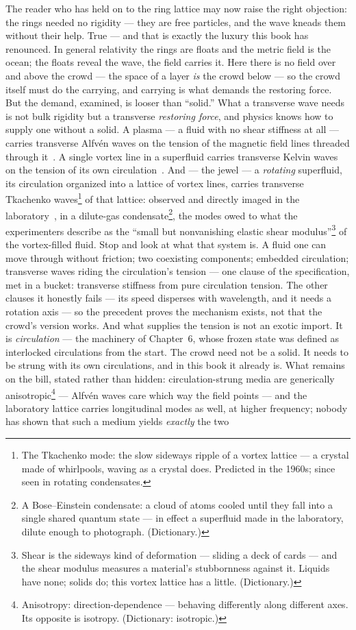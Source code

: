\documentclass[fontsize=11pt,paper=a4,pagesize=auto,parskip=half-]{scrbook}
\newcommand{\Ixtmp}{}
\DeclareRobustCommand{\Ix}[1]{%
  #1%
  \begingroup
    \lowercase{\gdef\Ixtmp{#1}}%
    \expandafter\index\expandafter{\Ixtmp}%
  \endgroup}
\begin{document}
The reader who has held on to the ring lattice may now raise the right objection: the rings needed no rigidity --- they are free particles, and the wave kneads them without their help. True --- and that is exactly the luxury this book has renounced. In general relativity the rings are floats and the metric field is the ocean; the floats reveal the wave, the field carries it. Here there is no field over and above the crowd --- the space of a layer \emph{is} the crowd below --- so the crowd itself must do the carrying, and carrying is what demands the restoring force. But the demand, examined, is looser than ``solid.'' What a transverse wave needs is not bulk rigidity but a transverse \emph{restoring force}, and physics knows how to supply one without a solid. A plasma --- a fluid with no shear stiffness at all --- carries transverse Alfv\'en waves on the tension of the magnetic field lines threaded through it~\cite{alfven1942}. A single \Ix{vortex} line in a superfluid carries transverse Kelvin waves on the tension of its own circulation~\cite{thomson1880}. And --- the jewel --- a \emph{rotating} superfluid, its circulation organized into a lattice of vortex lines, carries transverse Tkachenko waves\footnote{The Tkachenko mode: the slow sideways ripple of a vortex lattice --- a crystal made of whirlpools, waving as a crystal does. Predicted in the 1960s; since seen in rotating condensates.} of that lattice: observed and directly imaged in the laboratory~\cite{coddington2003}, in a dilute-gas condensate\footnote{A Bose--Einstein condensate: a cloud of atoms cooled until they fall into a single shared quantum state --- in effect a superfluid made in the laboratory, dilute enough to photograph. (Dictionary.)}, the modes owed to what the experimenters describe as the ``small but nonvanishing elastic shear modulus''\footnote{Shear is the sideways kind of deformation --- sliding a deck of cards --- and the shear modulus measures a material's stubbornness against it. Liquids have none; solids do; this vortex lattice has a little. (Dictionary.)} of the vortex-filled fluid. Stop and look at what that system is. A fluid one can move through without friction; two coexisting components; embedded circulation; transverse waves riding the circulation's tension --- one clause of the specification, met in a bucket: transverse stiffness from pure circulation tension. The other clauses it honestly fails --- its speed disperses with wavelength, and it needs a rotation axis --- so the precedent proves the mechanism exists, not that the crowd's version works. And what supplies the tension is not an exotic import. It is \emph{circulation} --- the machinery of Chapter~6, whose frozen state was defined as interlocked circulations from the start. The crowd need not be a solid. It needs to be strung with its own circulations, and in this book it already is. What remains on the bill, stated rather than hidden: circulation-strung media are generically anisotropic\footnote{Anisotropy: direction-dependence --- behaving differently along different axes. Its opposite is isotropy. (Dictionary: isotropic.)} --- Alfv\'en waves care which way the field points --- and the laboratory lattice carries longitudinal modes as well, at higher frequency; nobody has shown that such a medium yields \emph{exactly} the two 
\end{document}
